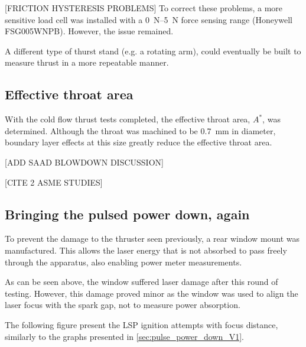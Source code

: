 
            [FRICTION HYSTERESIS PROBLEMS] To correct these problems, a more sensitive load cell was installed with a \qtyrange{0}{5}{N} force sensing range (Honeywell FSG005WNPB). However, the issue remained.

            A different type of thurst stand (e.g. a rotating arm), could eventually be built to measure thrust in a more repeatable manner.
        
        \subsection{Effective throat area}
            
            With the cold flow thrust tests completed, the effective throat area, $A^*$, was determined. Although the throat was machined to be \qty{0.7}{mm} in diameter, boundary layer effects at this size greatly reduce the effective throat area.

            [ADD SAAD BLOWDOWN DISCUSSION]

            [CITE 2 ASME STUDIES]

        \subsection{Bringing the pulsed power down, again}
            
            To prevent the damage to the thruster seen previously, a rear window mount was manufactured. This allows the laser energy that is not absorbed to pass freely through the apparatus, also enabling power meter measurements. 
            

            As can be seen above, the window suffered laser damage after this round of testing. However, this damage proved minor as the window was used to align the laser focus with the spark gap, not to measure power absorption.
            
            The following figure present the LSP ignition attempts with focus distance, similarly to the graphs presented in \autoref{sec:pulse_power_down_V1}.

